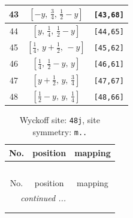 \documentclass[fleqn,8pt]{jsarticle}
\begin{document}
\begin{longtable}{ccc}
43 & $\left[ - y,\, \frac{3}{4},\, \frac{1}{2} - y \right]$ & {\tt [43,68]} \\ \hline
44 & $\left[ y,\, \frac{1}{4},\, \frac{1}{2} - y \right]$ & {\tt [44,65]} \\ \hline
45 & $\left[ \frac{1}{4},\, y + \frac{1}{2},\, - y \right]$ & {\tt [45,62]} \\ \hline
46 & $\left[ \frac{1}{4},\, \frac{1}{2} - y,\, y \right]$ & {\tt [46,61]} \\ \hline
47 & $\left[ y + \frac{1}{2},\, y,\, \frac{3}{4} \right]$ & {\tt [47,67]} \\ \hline
48 & $\left[ \frac{1}{2} - y,\, y,\, \frac{1}{4} \right]$ & {\tt [48,66]} \\
\end{longtable}
\renewcommand{\arraystretch}{1.2}
\begin{longtable}{ccc}
\caption{Wyckoff site: {\tt 48j}, site symmetry: {\tt m..}}
 \\
 \hline \hline
No. & position & mapping \\ \hline \endfirsthead

\multicolumn{2}{l}{\tablename\ \thetable{}} \\
 \hline \hline
No. & position & mapping \\ \hline \endhead

 \hline \hline
\multicolumn{2}{r}{\footnotesize\it continued ...} \\ \endfoot

 \hline \hline
\multicolumn{2}{r}{} \\ \endlastfoot


\end{longtable}
\end{document}

